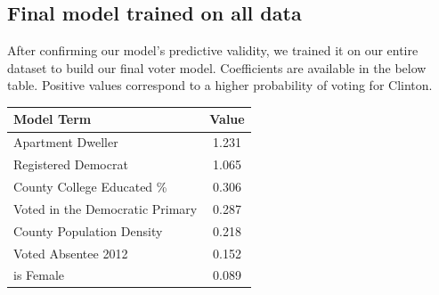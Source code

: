 \documentclass[10pt, letterpaper]{article}
\begin{document}
\begin{multicols}{2}
\subsection{Final model trained on all data}
After confirming our model's predictive validity, we trained it on our entire dataset to build our final voter model. Coefficients are available in the below table. Positive values correspond to a higher probability of voting for Clinton.

\begin{table}[H]
\centering
\begin{tabular}{|l|c|}
\hline
Model Term & Value \\
\hline 
Apartment Dweller & 1.231 \\
Registered Democrat & 1.065  \\
County College Educated \% & 0.306  \\
Voted in the Democratic Primary & 0.287  \\
County Population Density & 0.218  \\
Voted Absentee 2012 & 0.152 \\
is Female & 0.089  \\

\end{tabular}
\end{table}
\end{multicols}
\end{document}
